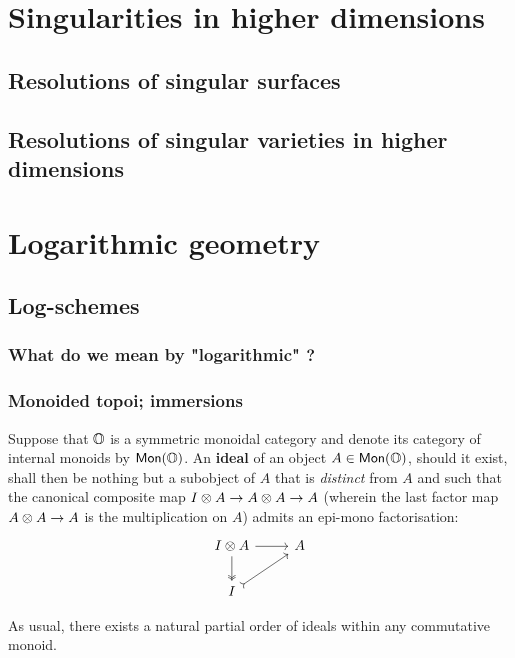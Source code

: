     \section{Singularities in higher dimensions}
        \subsection{Resolutions of singular surfaces}
        
        \subsection{Resolutions of singular varieties in higher dimensions}
        
    \section{Logarithmic geometry}
        \subsection{Log-schemes}
            \subsubsection{What do we mean by "logarithmic" ?}
            
            \subsubsection{Monoided topoi; immersions}
                \begin{definition}[Ideals] \label{def: ideals_in_symmetric_monoidal_categories}
                    Suppose that $\mathbb{O}$ is a symmetric monoidal category and denote its category of internal monoids by $\mathsf{Mon}(\mathbb{O})$. An \textbf{ideal} of an object $A \in \mathsf{Mon}(\mathbb{O})$, should it exist, shall then be nothing but a subobject of $A$ that is \textit{distinct} from $A$ and such that the canonical composite map $I \tensor A \to A \tensor A \to A$ (wherein the last factor map $A \tensor A \to A$ is the multiplication on $A$) admits an epi-mono factorisation:
                        $$
                            \begin{tikzcd}
                            	{I \tensor A} & A \\
                            	I
                            	\arrow[two heads, from=1-1, to=2-1]
                            	\arrow[tail, from=2-1, to=1-2]
                            	\arrow[from=1-1, to=1-2]
                            \end{tikzcd}
                        $$    
                \end{definition}
                \begin{remark}
                    As usual, there exists a natural partial order of ideals within any commutative monoid.
                \end{remark}
                
